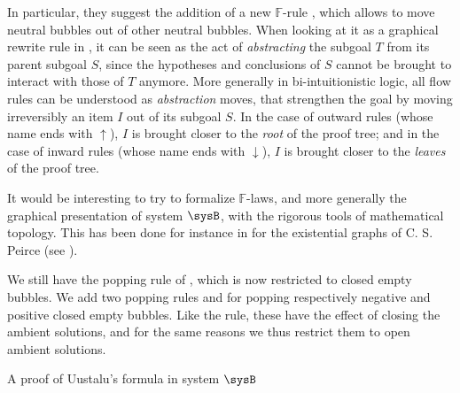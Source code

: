 \begin{description}
  In particular, they suggest the addition of a new $\mathbb{F}$-rule
  , which allows to move neutral bubbles out of other neutral
  bubbles. When looking at it as a graphical rewrite rule in
  , it can be seen as the act of \emph{abstracting} the
  subgoal $T$ from its parent subgoal $S$, since the hypotheses and conclusions
  of $S$ cannot be brought to interact with those of $T$ anymore. More generally
  in bi-intuitionistic logic, all flow rules can be understood as
  \emph{abstraction} moves, that strengthen the goal by moving irreversibly an
  item $I$ out of its subgoal $S$. In the case of outward rules (whose name ends
  with $\uparrow$), $I$ is brought closer to the \emph{root} of the proof tree;
  and in the case of inward rules (whose name ends with $\downarrow$), $I$ is
  brought closer to the \emph{leaves} of the proof tree.
  
  It would be interesting to try to formalize $\mathbb{F}$-laws, and more
  generally the graphical presentation of system $\sysB$, with the rigorous
  tools of mathematical topology. This has been done for instance in
   for the existential graphs of C. S.
  Peirce (see ).

  \item[\textbf{\membrane}] 
  We still have the popping rule  of , which is now restricted to
  closed empty bubbles. We add two popping rules  and  for
  popping respectively negative and positive closed empty bubbles. Like the
   rule, these have the effect of closing the ambient
  solutions, and for the same reasons we thus restrict them to open ambient
  solutions.

  \begin{marginfigure}
    
    \caption{A proof of Uustalu's formula in system $\sysB$}
  \end{marginfigure}


\end{description}
